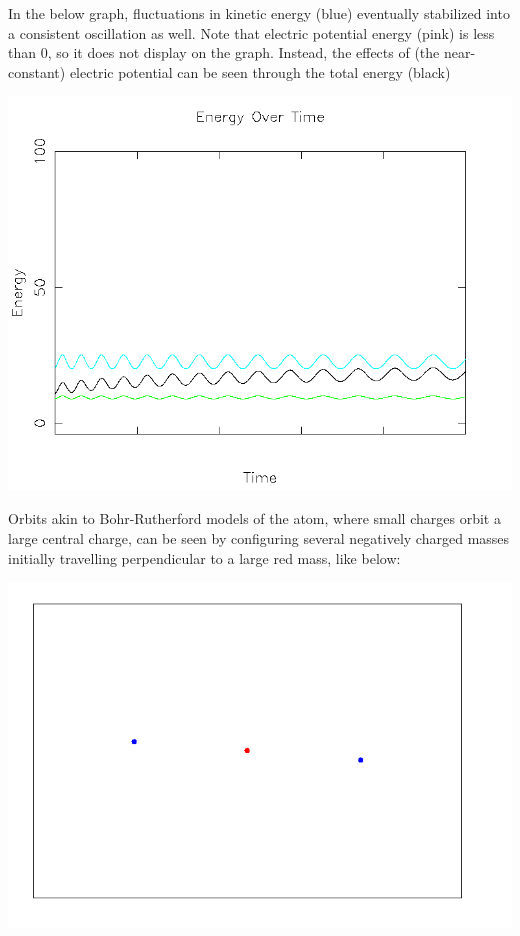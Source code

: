\documentclass{article}
\begin{document}
In the below graph, fluctuations in kinetic energy (blue) eventually stabilized into a consistent oscillation as well.
Note that electric potential energy (pink) is less than 0, so it does not display on the graph.
Instead, the effects of (the near-constant) electric potential can be seen through the total energy (black)
\\
\begin{center}
    \includegraphics[scale=0.5]{orbit_energy}
\end{center}

Orbits akin to Bohr-Rutherford models of the atom,
where small charges orbit a large central charge,
can be seen by configuring several negatively charged masses initially travelling perpendicular to a large red mass, like below:
\\
\begin{center}
    \includegraphics[scale=0.5]{atom}
\end{center}
\end{document}
